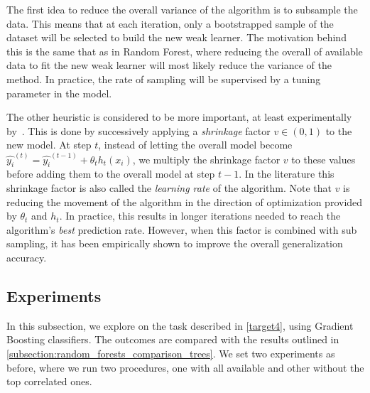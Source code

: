 The first idea to reduce the overall variance of the algorithm is to subsample the data. This means that at each iteration, only a bootstrapped sample of the dataset will be selected to build the new weak learner. The motivation behind this is the same that as in Random Forest, where reducing the overall of available data to fit the new weak learner will most likely reduce the variance of the method. In practice, the rate of sampling will be supervised by a tuning parameter in the model.

The other heuristic is considered to be more important, at least experimentally by~\cite{hastie-elemstatslearn}. This is done by successively applying a \textit{shrinkage} factor $v \in (0,1)$ to the new model. At step $t$, instead of letting the overall model become $ \hat{y_i}^{(t)} = \hat{y_i}^{(t-1)} + \theta_t h_t(x_i) $, we multiply the shrinkage factor $v$ to these values before adding them to the overall model at step $t-1$. In the literature this shrinkage factor is also called the \textit{learning rate} of the algorithm. Note that $v$ is reducing the movement of the algorithm in the direction of optimization provided by $\theta_t$ and $h_t$. In practice, this results in longer iterations needed to reach the algorithm's \textit{best} prediction rate. However, when this factor is combined with sub sampling, it has been empirically shown to improve the overall generalization accuracy.


%
%
%
%


\subsection{Experiments}\label{subsection:boosting_experiments}


In this subsection, we explore on the task described in \cref{target4}, using Gradient Boosting classifiers.
The outcomes are compared with the results outlined in \cref{subsection:random_forests_comparison_trees}.
We set two experiments as before, where we run two procedures, one with all available and other without the top correlated ones.

